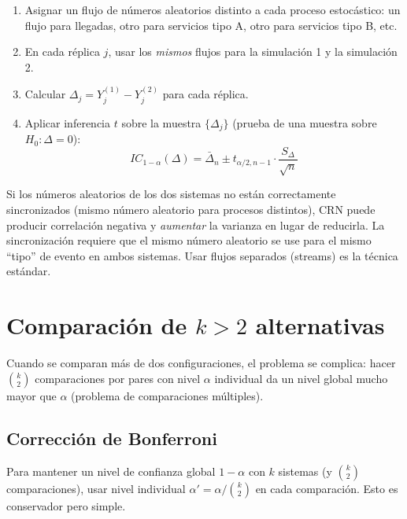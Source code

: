 \documentclass[11pt, letterpaper]{article}
\begin{document}
\begin{metodobox}
\begin{enumerate}
    \item Asignar un flujo de números aleatorios distinto a cada proceso estocástico: un flujo para llegadas, otro para servicios tipo A, otro para servicios tipo B, etc.
    \item En cada réplica $j$, usar los \emph{mismos} flujos para la simulación 1 y la simulación 2.
    \item Calcular $\Delta_j = Y_j^{(1)} - Y_j^{(2)}$ para cada réplica.
    \item Aplicar inferencia $t$ sobre la muestra $\{\Delta_j\}$ (prueba de una muestra sobre $H_0: \Delta = 0$):
    \[
    IC_{1-\alpha}(\Delta) = \bar\Delta_n \pm t_{\alpha/2,n-1} \cdot \frac{S_\Delta}{\sqrt{n}}
    \]
\end{enumerate}
\end{metodobox}

\begin{alertabox}
Si los números aleatorios de los dos sistemas no están correctamente sincronizados (mismo número aleatorio para procesos distintos), CRN puede producir correlación negativa y \emph{aumentar} la varianza en lugar de reducirla. La sincronización requiere que el mismo número aleatorio se use para el mismo ``tipo'' de evento en ambos sistemas. Usar flujos separados (streams) es la técnica estándar.
\end{alertabox}

\section{Comparación de $k > 2$ alternativas}

Cuando se comparan más de dos configuraciones, el problema se complica: hacer $\binom{k}{2}$ comparaciones por pares con nivel $\alpha$ individual da un nivel global mucho mayor que $\alpha$ (problema de comparaciones múltiples).

\subsection{Corrección de Bonferroni}

Para mantener un nivel de confianza global $1-\alpha$ con $k$ sistemas (y $\binom{k}{2}$ comparaciones), usar nivel individual $\alpha' = \alpha/\binom{k}{2}$ en cada comparación. Esto es conservador pero simple.
\end{document}
